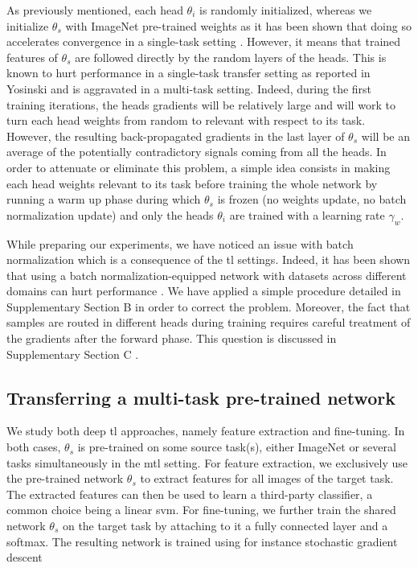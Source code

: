 As previously mentioned, each head $\theta_i$ is randomly initialized, whereas we initialize $\theta_s$ with ImageNet pre-trained weights as it has been shown that doing so accelerates convergence in a single-task setting \parencite{mormont2018comparison}. However, it means that trained features of $\theta_s$ are followed directly by the random layers of the heads. This is known to hurt performance in a single-task transfer setting as reported in Yosinski \etal \parencite{yosinski2014transferable} and is aggravated in a multi-task setting. Indeed, during the first training iterations, the heads gradients will be relatively large and will work to turn each head weights from random to relevant with respect to its task. However, the resulting back-propagated gradients in the last layer of $\theta_s$ will be an average of the potentially contradictory signals coming from all the heads. In order to attenuate or eliminate this problem, a simple idea consists in making each head weights relevant to its task before training the whole network by running a warm up phase during which $\theta_s$ is frozen (\ie no weights update, no batch normalization update) and only the heads $\theta_i$ are trained with a learning rate $\gamma_w$. 

While preparing our experiments, we have noticed an issue with batch normalization \parencite{ioffe2015batch} which is a consequence of the \acrlong{tl} settings. Indeed, it has been shown that using a batch normalization-equipped network with datasets across different domains can hurt performance \parencite{li2018adaptive, chang2019domain}. We have applied a simple procedure detailed in Supplementary Section B  in order to correct the problem. Moreover, the fact that samples are routed in different heads during training requires careful treatment of the gradients after the forward phase. This question is discussed in Supplementary Section C .

\subsection{Transferring a multi-task pre-trained network}
\label{ssec:mtask:transfer_techniques}

We study both deep \acrlong{tl} approaches, namely feature extraction and fine-tuning. In both cases, $\theta_s$ is pre-trained on some source task(s), either ImageNet or several tasks simultaneously in the \acrshort{mtl} setting. For feature extraction, we exclusively use the pre-trained network $\theta_s$ to extract features for all images of the target task. The extracted features can then be used to learn a third-party classifier, a common choice being a linear \acrshort{svm}. For fine-tuning, we further train the shared network $\theta_s$ on the target task by attaching to it a fully connected layer and a softmax. The resulting network is trained using for instance stochastic gradient descent

